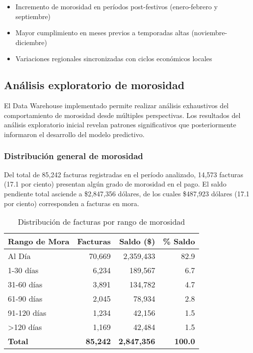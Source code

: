 \begin{itemize}
    \item Incremento de morosidad en períodos post-festivos (enero-febrero y septiembre)
    \item Mayor cumplimiento en meses previos a temporadas altas (noviembre-diciembre)
    \item Variaciones regionales sincronizadas con ciclos económicos locales
\end{itemize}
\subsection{Análisis exploratorio de morosidad}

El Data Warehouse implementado permite realizar análisis exhaustivos del comportamiento de morosidad desde múltiples perspectivas. Los resultados del análisis exploratorio inicial revelan patrones significativos que posteriormente informaron el desarrollo del modelo predictivo.

\subsubsection{Distribución general de morosidad}

Del total de 85,242 facturas registradas en el período analizado, 14,573 facturas (17.1 por ciento) presentan algún grado de morosidad en el pago. El saldo pendiente total asciende a \$2,847,356 dólares, de los cuales \$487,923 dólares (17.1 por ciento) corresponden a facturas en mora.

\begin{table}[ht]
\centering
\begin{tabular}{|l|r|r|r|}
\hline
\textbf{Rango de Mora} & \textbf{Facturas} & \textbf{Saldo (\$)} & \textbf{\% Saldo} \\
\hline
Al Día & 70,669 & 2,359,433 & 82.9 \\
1-30 días & 6,234 & 189,567 & 6.7 \\
31-60 días & 3,891 & 134,782 & 4.7 \\
61-90 días & 2,045 & 78,934 & 2.8 \\
91-120 días & 1,234 & 42,156 & 1.5 \\
>120 días & 1,169 & 42,484 & 1.5 \\
\hline
\textbf{Total} & \textbf{85,242} & \textbf{2,847,356} & \textbf{100.0} \\
\hline
\end{tabular}
\caption{Distribución de facturas por rango de morosidad}
\end{table}

